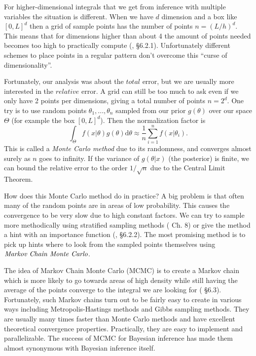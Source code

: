 \documentclass[12pt,vu]{adammath}
\theoremstyle{plain}
\theoremstyle{definition}
\theoremstyle{remark}
\begin{document}
For higher-dimensional integrals that we get from inference with multiple variables the situation is different.
When we have $d$ dimension and a box like $[0, L]^d$ then a grid of sample points has the number of points $n = (L / h)^d$.
This means that for dimensions higher than about 4 the amount of points needed becomes too high to practically compute (\cite{bayesianchoice}, \S 6.2.1).
Unfortunately different schemes to place points in a regular pattern don't overcome this ``curse of dimensionality''.

Fortunately, our analysis was about the $\textit{total}$ error, but we are usually more interested in the $\textit{relative}$ error.
A grid can still be too much to ask even if we only have 2 points per dimensions, giving a total number of points $n = 2^d$.
One try is to use random points $\theta_1, ..., \theta_n$ sampled from our prior $g(\theta)$ over our space $\Theta$ (for example the box $[0, L]^d$).
Then the normalization factor is $$\int_\Theta f(x | \theta) g(\theta) \mathrm{d}\theta \approx \frac{1}{n} \sum_{i=1}^n f(x | \theta_i).$$
This is called a \emph{Monte Carlo method} due to its randomness, and converges almost surely as $n$ goes to infinity.
If the variance of $g(\theta | x)$ (the posterior) is finite, we can bound the relative error to the order $1/\sqrt{n}$ due to the Central Limit Theorem.

How does this Monte Carlo method do in practice?
A big problem is that often many of the random points are in areas of low probability.
This causes the convergence to be very slow due to high constant factors.
We can try to sample more methodically using stratified sampling methods (\cite{mcmchandbook2} Ch. 8) or give the method a hint with an importance function (\cite{bayesianchoice}, \S 6.2.2).
The most promising method is to pick up hints where to look from the sampled points themselves using $\emph{Markov Chain Monte Carlo}$.

The idea of Markov Chain Monte Carlo (MCMC) is to create a Markov chain which is more likely to go towards areas of high density while still having the average of the points converge to the integral we are looking for (\cite{bayesianchoice} \S 6.3).
Fortunately, such Markov chains turn out to be fairly easy to create in various ways including Metropolis-Hastings methods and Gibbs sampling methods.
They are usually many times faster than Monte Carlo methods and have excellent theoretical convergence properties.
Practically, they are easy to implement and parallelizable.
The success of MCMC for Bayesian inference has made them almost synonymous with Bayesian inference itself.
\end{document}
